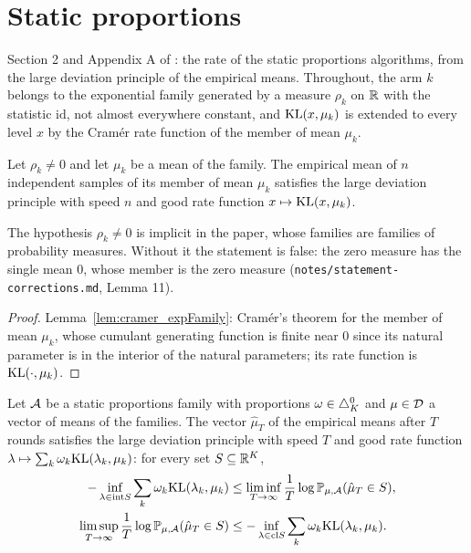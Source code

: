 \chapter{Static proportions}
\label{chap:static}

Section 2 and Appendix A of \cite{D23}: the rate of the static proportions algorithms, from the
large deviation principle of the empirical means. Throughout, the arm $k$ belongs to the
exponential family generated by a measure $\rho_k$ on $\mathbb{R}$ with the statistic $\mathrm{id}$, not
almost everywhere constant, and $\mathrm{KL}(x, \mu_k)$ is extended to every level $x$ by the Cramér rate
function of the member of mean $\mu_k$.

\begin{lemma}[{\cite[Lemma 11]{D23}}]
  \label{lem:ldp_single_arm}
  \leanok
  Let $\rho_k \ne 0$ and let $\mu_k$ be a mean of the family. The empirical mean of $n$ independent
  samples of its member of mean $\mu_k$ satisfies the large deviation principle with speed $n$ and
  good rate function $x \mapsto \mathrm{KL}(x, \mu_k)$.
\end{lemma}

The hypothesis $\rho_k \ne 0$ is implicit in the paper, whose families are families of probability
measures. Without it the statement is false: the zero measure has the single mean $0$, whose member
is the zero measure (\texttt{notes/statement-corrections.md}, Lemma 11).

\begin{proof}
  \leanok
  Lemma~\ref{lem:cramer_expFamily}: Cramér's theorem for the member of mean $\mu_k$, whose
  cumulant generating function is finite near $0$ since its natural parameter is in the interior
  of the natural parameters; its rate function is $\mathrm{KL}(\cdot, \mu_k)$.
\end{proof}

\begin{theorem}[{\cite[Theorem 12]{D23}}]
  \label{thm:ldp}
  \leanok
  Let $\mathcal{A}$ be a static proportions family with proportions $\omega \in \triangle_K^0$ and $\mu \in
  \mathcal{D}$ a vector of means of the families. The vector $\hat\mu_T$ of the empirical means after $T$
  rounds satisfies the large deviation principle with speed $T$ and good rate function
  $\lambda \mapsto \sum_k \omega_k \mathrm{KL}(\lambda_k, \mu_k)$: for every set $S \subseteq \mathbb{R}^K$,
  \begin{align*}
    -\inf_{\lambda \in \mathrm{int} S} \sum_k \omega_k \mathrm{KL}(\lambda_k, \mu_k)
    &\le \liminf_{T \to \infty} \frac{1}{T} \log \mathbb{P}_{\mu, \mathcal{A}}(\hat\mu_T \in S), \\
    \limsup_{T \to \infty} \frac{1}{T} \log \mathbb{P}_{\mu, \mathcal{A}}(\hat\mu_T \in S)
    &\le -\inf_{\lambda \in \mathrm{cl} S} \sum_k \omega_k \mathrm{KL}(\lambda_k, \mu_k).
  \end{align*}
\end{theorem}

